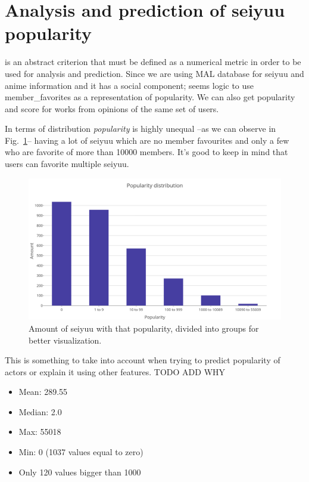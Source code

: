 \section{Analysis and prediction of seiyuu popularity}

 is an abstract criterion that must be defined as a numerical metric in order to be used for analysis and prediction. Since we are using MAL database for seiyuu and anime information and it has a social component; seems logic to use member\_favorites as a representation of popularity. We can also get popularity and score for works from opinions of the same set of users.

In terms of distribution \textit{popularity} is highly unequal \---as we can observe in Fig.~\ref{fig:popularityDistribution}\--- having a lot of seiyuu which are no member favourites and only a few who are favorite of more than 10000 members. It's good to keep in mind that users can favorite multiple seiyuu.

\begin{figure}[!hbt]
	\begin{center}
	\includegraphics[width=\columnwidth]{graphics/popularityDistribution.png}
	\caption{Amount of seiyuu with that popularity, divided into groups for better visualization.}
	\label{fig:popularityDistribution}
	\end{center}
\end{figure}

This is something to take into account when trying to predict popularity of actors or explain it using other features. TODO ADD WHY

\begin{itemize}
	\item Mean:    289.55
	\item Median:    2.0
	\item Max:    55018
	\item Min:    0 (1037 values equal to zero)
	\item Only 120 values bigger than 1000
\end{itemize}

